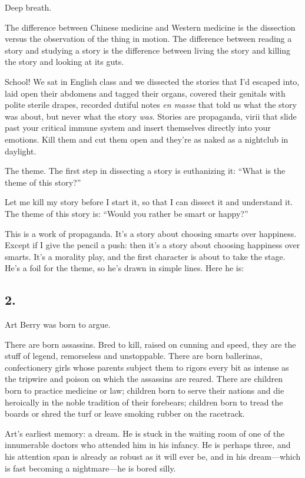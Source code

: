 Deep breath.

The difference between Chinese medicine and Western medicine is the
dissection versus the observation of the thing in motion. The
difference between reading a story and studying a story is the
difference between living the story and killing the story and
looking at its guts.

School! We sat in English class and we dissected the stories that
I’d escaped into, laid open their abdomens and tagged their organs,
covered their genitals with polite sterile drapes, recorded dutiful
notes \emph{en masse} that told us what the story was about, but
never what the story \emph{was}. Stories are propaganda, virii that
slide past your critical immune system and insert themselves
directly into your emotions. Kill them and cut them open and
they’re as naked as a nightclub in daylight.

The theme. The first step in dissecting a story is euthanizing it:
“What is the theme of this story?”

Let me kill my story before I start it, so that I can dissect it
and understand it. The theme of this story is: “Would you rather be
smart or happy?”

This is a work of propaganda. It’s a story about choosing smarts
over happiness. Except if I give the pencil a push: then it’s a
story about choosing happiness over smarts. It’s a morality play,
and the first character is about to take the stage. He’s a foil for
the theme, so he’s drawn in simple lines. Here he is:

\subsection{2.}

Art Berry was born to argue.

There are born assassins. Bred to kill, raised on cunning and
speed, they are the stuff of legend, remorseless and unstoppable.
There are born ballerinas, confectionery girls whose parents
subject them to rigors every bit as intense as the tripwire and
poison on which the assassins are reared. There are children born
to practice medicine or law; children born to serve their nations
and die heroically in the noble tradition of their forebears;
children born to tread the boards or shred the turf or leave
smoking rubber on the racetrack.

Art’s earliest memory: a dream. He is stuck in the waiting room of
one of the innumerable doctors who attended him in his infancy. He
is perhaps three, and his attention span is already as robust as it
will ever be, and in his dream—which is fast becoming a
nightmare—he is bored silly.

